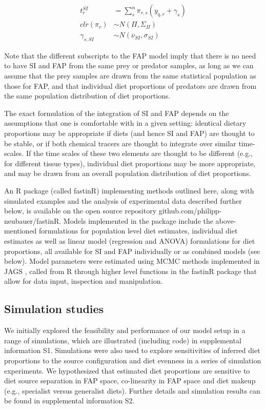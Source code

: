 \documentclass[fleqn,10pt]{wlpeerj}
\begin{document}
\begin{align}
\label{eq:4}
t_{r}^{SI} &=  \sum_{s}^n  \pi_{r,s}  \left(y_{q,r} + \gamma_{s} \right) \\
clr(\pi_{r}) &\sim N(\Pi,\Sigma_{\Pi})\\
\gamma_{s,SI} &\sim N(\nu_{SI},\sigma_{SI})
\end{align}


Note that the different subscripts to the FAP model imply that there is no need to have SI and
FAP from the same prey or predator samples, as long as we can assume that the prey samples are drawn
from the same statistical population as those for FAP, and that individual diet proportions of
predators are drawn from the same population distribution of diet
proportions.

The exact formulation of the integration of SI and FAP depends on the
assumptions that one is comfortable with in a given setting: identical
dietary proportions may be appropriate if diets (and hence SI and FAP)
are thought to be stable, or if both chemical tracers are thought to
integrate over similar time-scales. If the time scales of these two
elements are thought to be different (e.g., for different tissue
types), individual diet proportions may be more
appropriate, and may be drawn from an overall population distribution
of diet proportions. 


An R \citep{R_core_2014}
package (called fastinR) implementing methods outlined here, along with simulated
examples and the analysis of
experimental data described further below, is available on the
open source repository github.com/philipp-neubauer/fastinR. Models
implemented in the package include the above-mentioned formulations
for population level diet estimates, individual diet
estimates  as well as linear model
(regression and ANOVA) formulations for diet proportions, all
available for SI and FAP individually or as combined models (see
below). Model parameters were estimated using MCMC methods
implemented in JAGS \citep{plummer_jags_2003}, called
from R through higher level functions in the
fastinR package that allow for data input,
 inspection and manipulation.

\subsection*{Simulation studies}

We initially explored the feasibility and performance of our model setup in a
range of simulations, which are illustrated (including code) in supplemental information S1. Simulations were also used to explore sensitivities of inferred diet proportions to the source
configuration and diet evenness in a series of
simulation experiments. We hypothesized that estimated diet
proportions are sensitive to diet source separation in FAP space,
co-linearity in FAP space \citep{blanchard_inference_2011} and diet makeup (e.g., specialist versus 
generalist diets). Further details and simulation results can be found
in supplemental information S2.
\end{document}
